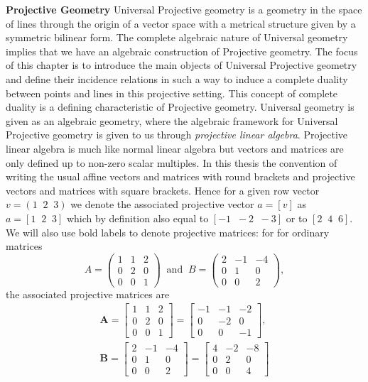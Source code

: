 \documentclass[11pt]{article}
\begin{document}
\textbf{Projective Geometry} Universal Projective geometry is a geometry in
the space of lines through the origin of a vector space with a metrical
structure given by a symmetric bilinear form.\newline
The complete algebraic nature of Universal geometry implies that we have an
algebraic construction of Projective geometry. The focus of this chapter is
to introduce the main objects of Universal Projective geometry and define
their incidence relations in such a way to induce a complete duality between
points and lines in this projective setting. This concept of complete
duality is a defining characteristic of Projective geometry.\newline
Universal geometry is given as an algebraic geometry, where the algebraic
framework for Universal Projective geometry is given to us through \textit{%
projective linear algebra}. Projective linear algebra is much like normal
linear algebra but vectors and matrices are only defined up to non-zero
scalar multiples. In this thesis the convention of writing the usual affine
vectors and matrices with round brackets and projective vectors and matrices
with square brackets. Hence for a given row vector $v=(1\;\;2\;\;3)$ we
denote the associated projective vector $a=[v]$ as $a=[1\;\;2\;\;3]$ which
by definition also equal to $[-1\;\;-2\;\;-3]$ or to $[2\;\;4\;\;6]$. We
will also use bold labels to denote projective matrices: for for ordinary
matrices 
\begin{equation*}
A=%
\begin{pmatrix}
1 & 1 & 2 \\ 
0 & 2 & 0 \\ 
0 & 0 & 1%
\end{pmatrix}
\;\;\text{and}\;\; B=%
\begin{pmatrix}
2 & -1 & -4 \\ 
0 & 1 & 0 \\ 
0 & 0 & 2%
\end{pmatrix}%
,
\end{equation*}
the associated projective matrices are 
\begin{align*}
\mathbf{A}=%
\begin{bmatrix}
1 & 1 & 2 \\ 
0 & 2 & 0 \\ 
0 & 0 & 1%
\end{bmatrix}%
= 
\begin{bmatrix}
-1 & -1 & -2 \\ 
0 & -2 & 0 \\ 
0 & 0 & -1%
\end{bmatrix}%
, \\
\mathbf{B}=%
\begin{bmatrix}
2 & -1 & -4 \\ 
0 & 1 & 0 \\ 
0 & 0 & 2%
\end{bmatrix}%
= 
\begin{bmatrix}
4 & -2 & -8 \\ 
0 & 2 & 0 \\ 
0 & 0 & 4%
\end{bmatrix}%
\end{align*}
\end{document}
